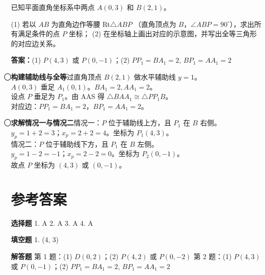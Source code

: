 \documentclass{exam-zh}
\newcommand{\answerarea}[1][40mm]{%
  \vspace{2mm}%
  \begin{tcolorbox}[
    enhanced, breakable,
    colback=white,
    colframe=white,
    boxrule=0pt,
    height=#1,
    valign=top,
    bottom=0mm,
    after skip=0mm,
  ]
  \end{tcolorbox}%
}
\newcounter{solstep}
\newcommand{\solstep}[2]{%
  \stepcounter{solstep}%
  \par\medskip
  \noindent\hangindent=6mm
  {\color{edu-blue}\bfseries\textcircled{\scriptsize\thesolstep}\enspace #1}\enspace #2\par
}
\begin{document}
\begin{problem}[points=20]
  已知平面直角坐标系中两点 $A(0, 3)$ 和 $B(2, 1)$。

(1) 若以 $AB$ 为直角边作等腰 Rt$\triangle ABP$ （直角顶点为 $B$，$\angle ABP = 90^\circ$），求出所有满足条件的点 $P$ 坐标；
(2) 在坐标轴上画出对应的示意图，并写出全等三角形的对应边关系。
  \answerarea[60mm]
  \setcounter{solstep}{0}
  \begin{solutionblock}
    \textbf{答案：}(1) $P(4, 3)$ 或 $P(0, -1)$；(2) $PP_1 = BA_1 = 2$, $BP_1 = AA_1 = 2$\par\medskip
    \solstep{构建辅助线与全等}{过直角顶点 $B(2,1)$ 做水平辅助线 $y=1$。\\ $A(0,3)$ 垂足 $A_1(0,1)$。$BA_1 = 2, AA_1 = 2$。\\ 设点 $P$ 垂足为 $P_1$。由 AAS 得 $\triangle BAA_1 \cong \triangle PP_1B$。\\ 对应边：$PP_1 = BA_1 = 2$，$BP_1 = AA_1 = 2$。}
    \solstep{求解情况一与情况二}{情况一：$P$ 位于辅助线上方，且 $P_1$ 在 $B$ 右侧。\\ $y_p = 1+2=3$；$x_p = 2+2=4$。坐标为 $P_1(4, 3)$。\\ 情况二：$P$ 位于辅助线下方，且 $P_1$ 在 $B$ 左侧。\\ $y_p = 1-2=-1$；$x_p = 2-2=0$。坐标为 $P_2(0, -1)$。\\ 故点 $P$ 坐标为 $(4, 3)$ 或 $(0, -1)$。}
  \end{solutionblock}
\end{problem}


\clearpage
\section*{参考答案}


\begin{keyideabox}
  \textbf{选择题}
  1. A  2. A  3. A  4. A
\end{keyideabox}



\begin{keyideabox}
  \textbf{填空题}
  1. (4, 3)
\end{keyideabox}



\begin{keyideabox}
  \textbf{解答题}
  第 1 题：(1) $D(0, 2)$；(2) $P(4, 2)$ 或 $P(0, -2)$
第 2 题：(1) $P(4, 3)$ 或 $P(0, -1)$；(2) $PP_1 = BA_1 = 2$, $BP_1 = AA_1 = 2$
\end{keyideabox}
\end{document}

